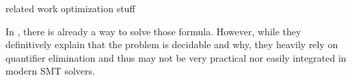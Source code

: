
related work
optimization stuff

In \cite{AlbertiGP16, schweikardt}, there is already a way to solve
those formula. However, while they definitively explain that the problem
is decidable and why, they heavily rely on quantifier elimination and
thus may not be very practical nor easily integrated in modern SMT
solvers.
